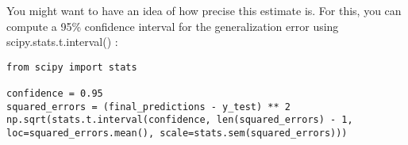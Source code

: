 \documentclass[french]{article}
\begin{document}
You might want to have an idea of how precise this estimate is.  For this, you can compute a 95\% confidence interval for the generalization error using scipy.stats.t.interval() :
\begin{lstlisting}
from scipy import stats

confidence = 0.95
squared_errors = (final_predictions - y_test) ** 2
np.sqrt(stats.t.interval(confidence, len(squared_errors) - 1, loc=squared_errors.mean(), scale=stats.sem(squared_errors)))
\end{lstlisting}
\end{document}
